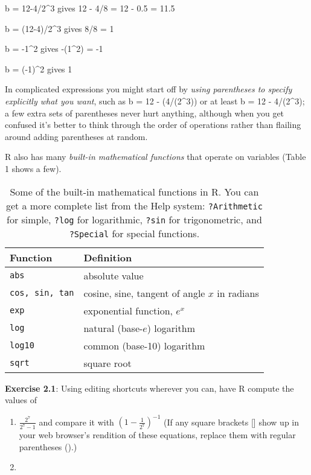 \documentclass[11pt,]{article}
\begin{document}
b = 12-4/2\^{}3 gives 12 - 4/8 = 12 - 0.5 = 11.5

b = (12-4)/2\^{}3 gives 8/8 = 1

b = -1\^{}2 gives -(1\^{}2) = -1

b = (-1)\^{}2 gives 1

In complicated expressions you might start off by \emph{using
parentheses to specify explicitly what you want}, such as b = 12 -
(4/(2\^{}3)) or at least b = 12 - 4/(2\^{}3); a few extra sets of
parentheses never hurt anything, although when you get confused it's
better to think through the order of operations rather than flailing
around adding parentheses at random.

R also has many \emph{built-in mathematical functions} that operate on
variables (Table 1 shows a few).

\begin{table}

\caption{\label{tab:unnamed-chunk-9}Some of the built-in mathematical functions in R. You can get a more complete list from the Help system: \texttt{?Arithmetic} for simple, \texttt{?log} for logarithmic, \texttt{?sin} for trigonometric, and \texttt{?Special} for special functions.}
\centering
\begin{tabular}[t]{ll}
\toprule
Function & Definition\\
\midrule
\texttt{abs} & absolute value\\
\texttt{cos, sin, tan} & cosine, sine, tangent of angle $x$ in radians\\
\texttt{exp} & exponential function, $e^x$\\
\texttt{log} & natural (base-$e$) logarithm\\
\texttt{log10} & common (base-10) logarithm\\
\texttt{sqrt} & square root\\
\bottomrule
\end{tabular}
\end{table}

\textbf{Exercise 2.1}: Using editing shortcuts wherever you can, have R
compute the values of

\begin{enumerate}
\def\labelenumi{\arabic{enumi}.}
\item
  \(\frac{2^7}{2^7 - 1}\) and compare it with
  \(( {1 - \frac{1}{2^7}} )^{-1}\) (If any square brackets {[}{]} show
  up in your web browser's rendition of these equations, replace them
  with regular parentheses ().)
\item
\end{enumerate}
\end{document}
